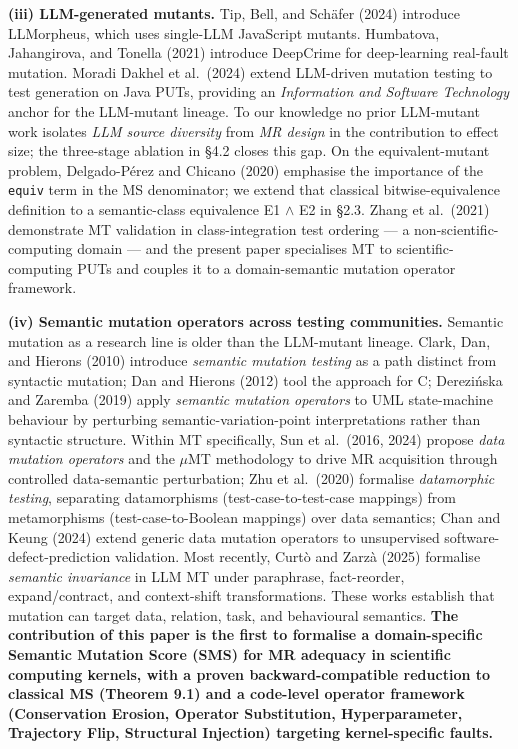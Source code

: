\documentclass[review,12pt,authoryear]{elsarticle}
\begin{document}
\textbf{(iii) LLM-generated mutants.} Tip, Bell, and Schäfer (2024)
introduce LLMorpheus, which uses single-LLM JavaScript mutants.
Humbatova, Jahangirova, and Tonella (2021) introduce DeepCrime for
deep-learning real-fault mutation. Moradi Dakhel et al.~(2024) extend
LLM-driven mutation testing to test generation on Java PUTs, providing
an \emph{Information and Software Technology} anchor for the LLM-mutant
lineage. To our knowledge no prior LLM-mutant work isolates \emph{LLM
source diversity} from \emph{MR design} in the contribution to effect
size; the three-stage ablation in §4.2 closes this gap. On the
equivalent-mutant problem, Delgado-Pérez and Chicano (2020) emphasise
the importance of the \texttt{equiv} term in the MS denominator; we
extend that classical bitwise-equivalence definition to a semantic-class
equivalence E1 $\wedge$ E2 in §2.3. Zhang et al.~(2021) demonstrate MT
validation in class-integration test ordering --- a
non-scientific-computing domain --- and the present paper specialises MT
to scientific-computing PUTs and couples it to a domain-semantic
mutation operator framework.

\textbf{(iv) Semantic mutation operators across testing communities.}
Semantic mutation as a research line is older than the LLM-mutant
lineage. Clark, Dan, and Hierons (2010) introduce \emph{semantic
mutation testing} as a path distinct from syntactic mutation; Dan and
Hierons (2012) tool the approach for C; Derezińska and Zaremba (2019)
apply \emph{semantic mutation operators} to UML state-machine behaviour
by perturbing semantic-variation-point interpretations rather than
syntactic structure. Within MT specifically, Sun et al.~(2016, 2024)
propose \emph{data mutation operators} and the $\mu$MT methodology to drive
MR acquisition through controlled data-semantic perturbation; Zhu et
al.~(2020) formalise \emph{datamorphic testing}, separating
datamorphisms (test-case-to-test-case mappings) from metamorphisms
(test-case-to-Boolean mappings) over data semantics; Chan and Keung
(2024) extend generic data mutation operators to unsupervised
software-defect-prediction validation. Most recently, Curtò and Zarzà
(2025) formalise \emph{semantic invariance} in LLM MT under paraphrase,
fact-reorder, expand/contract, and context-shift transformations. These
works establish that mutation can target data, relation, task, and
behavioural semantics. \textbf{The contribution of this paper is the
first to formalise a domain-specific Semantic Mutation Score (SMS) for
MR adequacy in scientific computing kernels, with a proven
backward-compatible reduction to classical MS (Theorem 9.1) and a
code-level operator framework (Conservation Erosion, Operator
Substitution, Hyperparameter, Trajectory Flip, Structural Injection)
targeting kernel-specific faults.}
\end{document}

